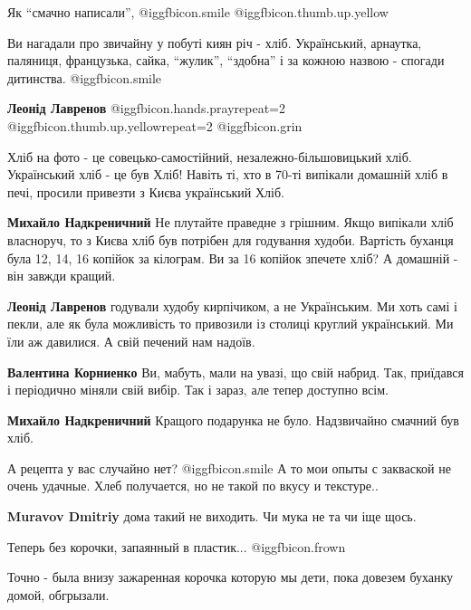 \begin{itemize}
Як \enquote{смачно написали}, @igg{fbicon.smile}  @igg{fbicon.thumb.up.yellow} 


Ви нагадали про звичайну у побуті киян річ - хліб. Український, арнаутка,
паляниця, французька, сайка, \enquote{жулик}, \enquote{здобна} і за кожною назвою - спогади
дитинства.  @igg{fbicon.smile} 

\textbf{Леонід Лавренов}  @igg{fbicon.hands.pray}{repeat=2}  @igg{fbicon.thumb.up.yellow}{repeat=2}  @igg{fbicon.grin} 

Хліб на фото - це совецько-самостійний, незалежно-більшовицький хліб.
Український хліб - це був Хліб!
Навіть ті, хто в 70-ті випікали домашній хліб в печі, просили привезти з Києва український Хліб.

\begin{itemize} %
\textbf{Михайло Надкреничний} Не плутайте праведне з грішним. Якщо випікали хліб власноруч, то з Києва хліб був потрібен для годування худоби. Вартість буханця була 12, 14, 16 копійок за кілограм. Ви за 16 копійок зпечете хліб? А домашній - він завжди кращий.

\textbf{Леонід Лавренов} годували худобу кирпічиком, а не Українським. Ми хоть самі і пекли, але як була можливість то привозили із столиці круглий український. Ми їли аж давилися. А свій печений нам надоїв.

\textbf{Валентина Корниенко} Ви, мабуть, мали на увазі, що свій набрид. Так, приїдався і періодично міняли свій вибір. Так і зараз, але тепер доступно всім.

\textbf{Михайло Надкреничний} Кращого подарунка не було. Надзвичайно смачний був хліб.
\end{itemize} %

А рецепта у вас случайно нет?  @igg{fbicon.smile}  А то мои опыты с закваской не очень удачные.
Хлеб получается, но не такой по вкусу и текстуре..

\textbf{Muravov Dmitriy} дома такий не виходить. Чи мука не та чи іще щось.

Теперь без корочки, запаянный в пластик...  @igg{fbicon.frown} 

Точно - была внизу зажаренная корочка которую мы дети, пока довезем буханку домой, обгрызали.


\end{itemize}
